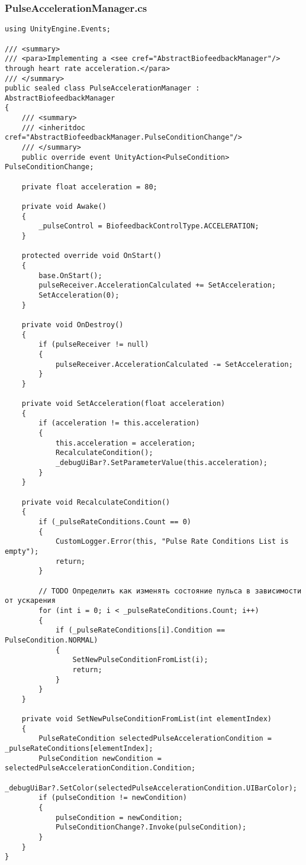 \subsubsection*{PulseAccelerationManager.cs}
\begin{verbatim}
using UnityEngine.Events;

/// <summary>
/// <para>Implementing a <see cref="AbstractBiofeedbackManager"/> through heart rate acceleration.</para>
/// </summary>
public sealed class PulseAccelerationManager : AbstractBiofeedbackManager
{
    /// <summary>
    /// <inheritdoc cref="AbstractBiofeedbackManager.PulseConditionChange"/>
    /// </summary>
    public override event UnityAction<PulseCondition> PulseConditionChange;

    private float acceleration = 80;

    private void Awake()
    {
        _pulseControl = BiofeedbackControlType.ACCELERATION;
    }

    protected override void OnStart()
    {
        base.OnStart();
        pulseReceiver.AccelerationCalculated += SetAcceleration;
        SetAcceleration(0);
    }

    private void OnDestroy()
    {
        if (pulseReceiver != null)
        {
            pulseReceiver.AccelerationCalculated -= SetAcceleration;
        }
    }

    private void SetAcceleration(float acceleration)
    {
        if (acceleration != this.acceleration)
        {
            this.acceleration = acceleration;
            RecalculateCondition();
            _debugUiBar?.SetParameterValue(this.acceleration);
        }
    }

    private void RecalculateCondition()
    {
        if (_pulseRateConditions.Count == 0)
        {
            CustomLogger.Error(this, "Pulse Rate Conditions List is empty");
            return;
        }

        // TODO Определить как изменять состояние пульса в зависимости от ускарения
        for (int i = 0; i < _pulseRateConditions.Count; i++)
        {
            if (_pulseRateConditions[i].Condition == PulseCondition.NORMAL)
            {
                SetNewPulseConditionFromList(i);
                return;
            }
        }
    }

    private void SetNewPulseConditionFromList(int elementIndex)
    {
        PulseRateCondition selectedPulseAccelerationCondition = _pulseRateConditions[elementIndex];
        PulseCondition newCondition = selectedPulseAccelerationCondition.Condition;
        _debugUiBar?.SetColor(selectedPulseAccelerationCondition.UIBarColor);
        if (pulseCondition != newCondition)
        {
            pulseCondition = newCondition;
            PulseConditionChange?.Invoke(pulseCondition);
        }
    }
}
\end{verbatim}
